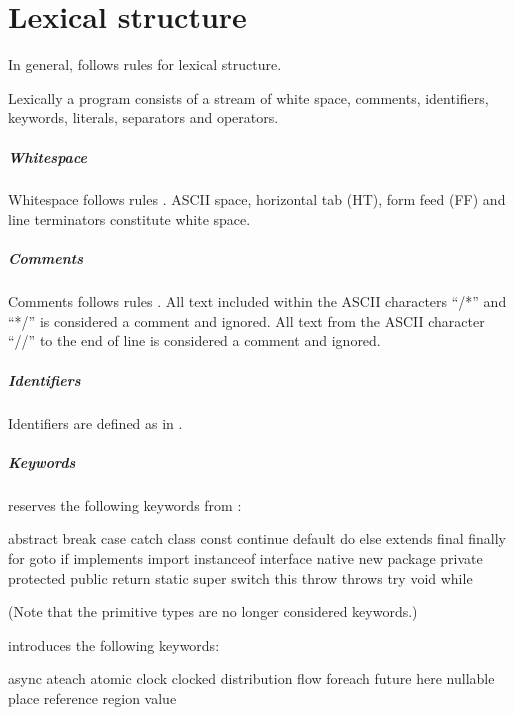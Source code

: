 \chapter{Lexical structure}

In general, \Xten{} follows \java{} rules \cite[Chapter 3]{jls2} for
lexical structure.

Lexically a program consists of a stream of white space, comments,
identifiers, keywords, literals, separators and operators.

\paragraph{Whitespace}
Whitespace  follows \java{} rules
\cite[Chapter 3.6]{jls2}. ASCII space, horizontal tab (HT), form feed (FF) and line terminators constitute white space.


\paragraph{Comments}
Comments  follows \java{} rules
\cite[Chapter 3.7]{jls2}. 
All text included within the ASCII characters ``/*'' and ``*/'' is
considered a comment and ignored. All text from the ASCII character
``//'' to the end of line is considered a comment and ignored.

\paragraph{Identifiers}
Identifiers  are defined as in \java.

\paragraph{Keywords}
\Xten{} reserves the following keywords  from \java:
\begin{x10}
abstract   break  case       catch
class      const  continue   default    
do         else   extends    final
finally    for    goto       if            
implements import instanceof interface
native     new    package    private      
protected  public return     static
super      switch this       throw
throws     try    void       while
\end{x10}
(Note that the primitive types are no longer considered keywords.)

\Xten{}  introduces the following keywords:
\begin{x10}
async     ateach       atomic   clock
clocked   distribution flow     foreach
future    here         nullable place  
reference region       value
\end{x10}


